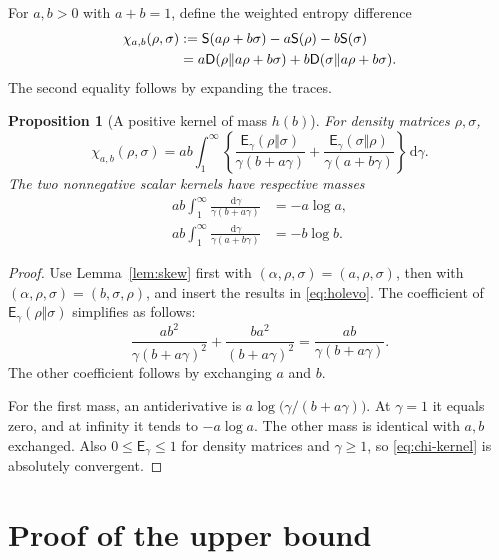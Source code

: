 \documentclass[11pt]{article}
\numberwithin{equation}{section}
\newtheorem{proposition}[theorem]{Proposition}
\theoremstyle{remark}
\newcommand{\ent}{\mathsf S}
\newcommand{\rel}{\mathsf D}
\newcommand{\hs}{\mathsf E}
\newcommand{\dd}{\,\mathrm d}
\begin{document}
For $a,b>0$ with $a+b=1$, define the weighted entropy difference
\begin{align}
 \chi_{a,b}(\rho,\sigma)
   &:=\ent(a\rho+b\sigma)-a\ent(\rho)-b\ent(\sigma)\notag\\
   &=a\rel(\rho\Vert a\rho+b\sigma)
     +b\rel(\sigma\Vert a\rho+b\sigma).
 \label{eq:holevo}
\end{align}
The second equality follows by expanding the traces.

\begin{proposition}[A positive kernel of mass $h(b)$]
\label{prop:kernel}
For density matrices $\rho,\sigma$,
\begin{equation}
 \boxed{\displaystyle
 \chi_{a,b}(\rho,\sigma)
 =ab\int_1^\infty\left\{
 \frac{\hs_\gamma(\rho\Vert\sigma)}{\gamma(b+a\gamma)}
 +\frac{\hs_\gamma(\sigma\Vert\rho)}{\gamma(a+b\gamma)}
 \right\}\dd\gamma.}
 \label{eq:chi-kernel}
\end{equation}
The two nonnegative scalar kernels have respective masses
\begin{align}
 ab\int_1^\infty\frac{\dd\gamma}{\gamma(b+a\gamma)}
    &=-a\log a,\label{eq:mass-a}\\
 ab\int_1^\infty\frac{\dd\gamma}{\gamma(a+b\gamma)}
    &=-b\log b.\label{eq:mass-b}
\end{align}
\end{proposition}
\begin{proof}
Use Lemma~\ref{lem:skew} first with $(\alpha,\rho,\sigma)=(a,\rho,\sigma)$,
then with $(\alpha,\rho,\sigma)=(b,\sigma,\rho)$, and insert the results
in \eqref{eq:holevo}. The coefficient of
$\hs_\gamma(\rho\Vert\sigma)$ simplifies as follows:
\[
 \frac{ab^2}{\gamma(b+a\gamma)^2}
 +\frac{ba^2}{(b+a\gamma)^2}
 =\frac{ab}{\gamma(b+a\gamma)}.
\]
The other coefficient follows by exchanging $a$ and $b$.

For the first mass, an antiderivative is
$a\log\bigl(\gamma/(b+a\gamma)\bigr)$. At $\gamma=1$ it equals zero,
and at infinity it tends to $-a\log a$. The other mass is identical
with $a,b$ exchanged. Also $0\le\hs_\gamma\le1$ for density matrices
and $\gamma\ge1$, so \eqref{eq:chi-kernel} is absolutely convergent.
\end{proof}

\section{Proof of the upper bound}
\end{document}

